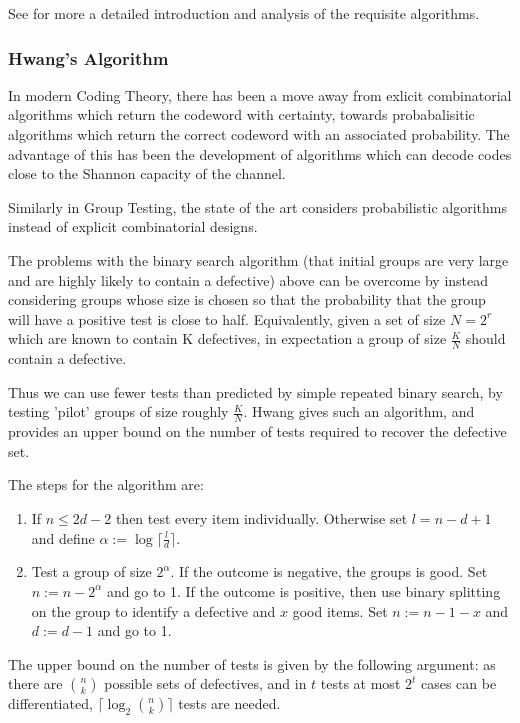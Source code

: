 See \cite{cgt} for more a detailed introduction and analysis of the requisite algorithms.

\subsubsection*{Hwang's Algorithm}
In modern Coding Theory, there has been a move away from exlicit combinatorial algorithms which return the codeword with certainty, towards probabalisitic algorithms which return the correct codeword with an associated probability. The advantage of this has been the development of algorithms which can decode codes close to the Shannon capacity of the channel.

Similarly in Group Testing, the state of the art considers probabilistic algorithms instead of explicit combinatorial designs. 

The problems with the binary search algorithm (that initial groups are very large and are highly likely to contain a defective) above can be overcome by instead considering groups whose size is chosen so that the probability that the group will have a positive test is close to half. Equivalently, given a set of size \(N=2^r\) which are known to contain K defectives, in expectation a group of size \(\frac{K}{N}\) should contain a defective. 

Thus we can use fewer tests than predicted by simple repeated binary search, by testing 'pilot' groups of size roughly \(\frac{K}{N}\). Hwang \cite{Hwang1972} gives such an algorithm, and provides an upper bound on the number of tests required to recover the defective set.

The steps for the algorithm are:

\begin{enumerate}
\item If \(n \leq 2d-2\) then test every item individually. Otherwise set \(l = n - d + 1\) and define \(\alpha:=\log{\lceil \frac{l}{d}\rceil}\).
\item Test a group of size \(2^\alpha\). If the outcome is negative, the groups is good. Set \(n := n - 2^\alpha \) and go to 1. If the outcome is positive, then use binary splitting on the group to identify a defective and \(x\) good items. Set \(n := n - 1 -x \) and \(d:= d-1\) and go to 1.
\end{enumerate}

The upper bound on the number of tests is given by the following argument: as there are \(n \choose k\) possible sets of defectives, and in \(t\) tests at most \(2^t\) cases can be differentiated, \(\lceil \log_2{n \choose k} \rceil\) tests are needed. 

